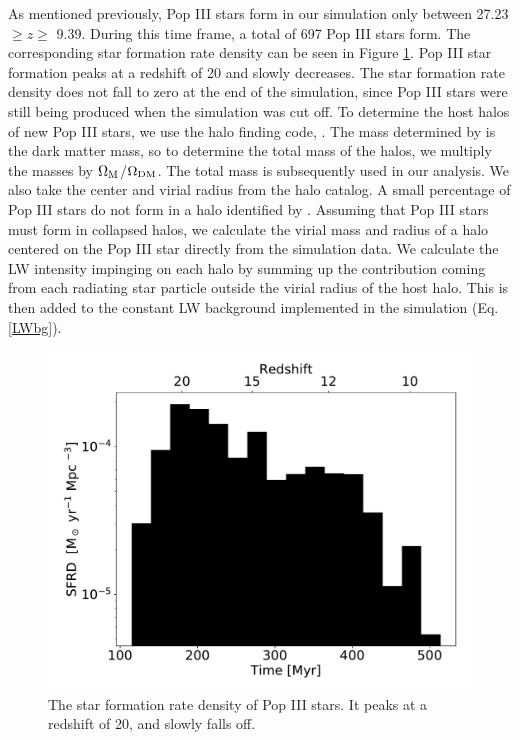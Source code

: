 \documentclass[a4paper,fleqn,usenatbib]{mnras}
\begin{document}
As mentioned previously, Pop III stars form in our simulation only between 27.23 $\geq z \geq$ 9.39. During this time frame, a total of 697 Pop III stars form. The corresponding star formation rate density can be seen in Figure \ref{fig:pop3_SFR_bar}. Pop III star formation peaks at a redshift of 20 and slowly decreases. The star formation rate density does not fall to zero at the end of the simulation, since Pop III stars were still being produced when the simulation was cut off. To determine the host halos of new Pop III stars, we use the halo finding code, \rockstar{} \citep{rockstar}. The mass determined by \rockstar{} is the dark matter mass, so to determine the total mass of the halos, we multiply the masses by $\Omega_{\rm M}$/$\Omega_{\rm DM}$. The total mass is subsequently used in our analysis. We also take the center and virial radius from the \rockstar{} halo catalog. A small percentage of Pop III stars do not form in a halo identified by \rockstar{}. Assuming that Pop III stars must form in collapsed halos, we calculate the virial mass and radius of a halo centered on the Pop III star directly from the simulation data. We calculate the LW intensity impinging on each halo by summing up the contribution coming from each radiating star particle outside the virial radius of the host halo. This is then added to the constant LW background implemented in the simulation (Eq. \ref{LWbg}). 

\begin{figure}
	\includegraphics[width=\columnwidth]{images/pop3_SFR_bar.pdf}
    \caption{The star formation rate density of Pop III stars. It peaks at a redshift of 20, and slowly falls off.}
    \label{fig:pop3_SFR_bar}
\end{figure}
\end{document}
